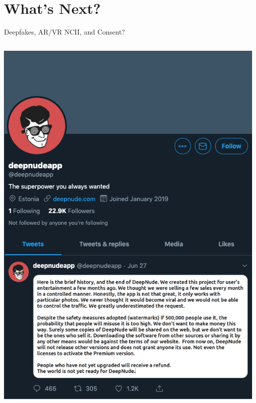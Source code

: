 \documentclass[nobackground,dvipsnames,table,aspectratio=169]{beamer}
\begin{document}
\section{What's Next?}

\begin{frame}{Deepfakes, AR/VR NCII, and Consent?}
    \begin{columns}
            \includegraphics[width=\textwidth]{deepfakes-1}

\end{columns}
\end{frame}
\end{document}
